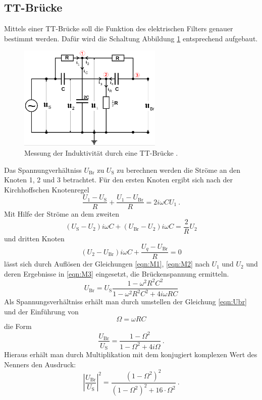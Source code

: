 \subsection{TT-Brücke}
Mittels einer TT-Brücke soll die Funktion des elektrischen Filters genauer bestimmt werden. Dafür wird die Schaltung Abbildung \ref{fig:TT} entsprechend aufgebaut.
\begin{figure}
  \centering
  \includegraphics[height=5cm]{picture/7.png}
  \caption{Messung der Induktivität durch eine TT-Brücke \cite{sample}.}
  \label{fig:TT}
\end{figure}
Das Spannungverhältniss $U_\text{Br}$ zu $U_\text{S}$ zu berechnen werden die Ströme an den Knoten 1, 2 und 3 betrachtet. Für den ersten Knoten ergibt sich nach der Kirchhoffschen Knotenregel
\begin{equation}
  \frac{U_1 - U_\text{S}}{R} + \frac{U_1 - U_\text{Br}}{R} = 2 i \omega C U_1 \ .
  \label{eqn:M1}
\end{equation}
Mit Hilfe der Ströme an dem zweiten
\begin{equation}
  \left( U_\text{S} - U_2 \right) i \omega C + \left( U_\text{Br} - U_2 \right)i \omega C = \frac{2}{R} U_2
  \label{eqn:M2}
\end{equation}
und dritten Knoten
\begin{equation}
  \left( U_2 - U_\text{Br} \right)i \omega C + \frac{U_q - U_\text{Br}}{R} = 0
  \label{eqn:M3}
\end{equation}
lässt sich durch Auflösen der Gleichungen \ref{eqn:M1}, \ref{eqn:M2} nach $U_1$ und $U_2$ und deren Ergebnisse in \ref{eqn:M3} eingesetzt, die Brückenspannung ermitteln.
\begin{equation}
  U_\text{Br} = U_\text{S} \frac{1 - \omega^2 R^2 C^2}{1 - \omega^2 R^2 C^2 + 4 i \omega R C}
  \label{eqn:Ubr}
\end{equation}
Als Spannungsverhältniss erhält man durch umstellen der Gleichung \ref{eqn:Ubr} und der Einführung von
\begin{equation*}
  \Omega = \omega R C
\end{equation*}
die Form
\begin{equation*}
  \frac{U_\text{Br}}{U_\text{S}} = \frac{1 - \Omega^2}{1 - \Omega^2 + 4 i \Omega} \ .
\end{equation*}
Hieraus erhält man durch Multiplikation mit dem konjugiert komplexen Wert
des Nenners den Ausdruck:
\begin{equation}
  \left| \frac{U_\text{Br}}{U_\text{S}} \right|^2 = \frac{(1 - \Omega^2)^2}{(1 - \Omega^2)^2 + 16 \cdot \Omega^2} \ .
  \label{eqn:BrS}
\end{equation}

